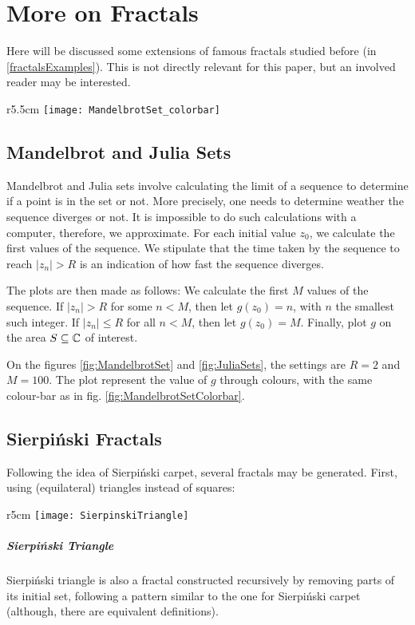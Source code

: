 \section{More on Fractals}
Here will be discussed some extensions of famous fractals studied before (in \ref{fractalsExamples}).
This is not directly relevant for this paper, but an involved reader may be interested.

\begin{wrapfigure}{r}{5.5cm}
	\vspace{-1.5cm}
	\texttt{[image: MandelbrotSet\_colorbar]}
	\centering
	\captionsetup{justification=centering}
	\caption{Mandelbrot Set}
	\label{fig:MandelbrotSetColorbar}
\end{wrapfigure}
\subsection{Mandelbrot and Julia Sets}
Mandelbrot and Julia sets involve calculating the limit of a sequence to determine if a point is in the set or not.
More precisely, one needs to determine weather the sequence diverges or not.
It is impossible to do such calculations with a computer, therefore, we approximate.
For each initial value $z_0$, we calculate the first values of the sequence.
We stipulate that the time taken by the sequence to reach $|z_n|>R$ is an indication of how fast the sequence diverges.

The plots are then made as follows:
We calculate the first $M$ values of the sequence.
If $|z_n|>R$ for some $n<M$, then let $g(z_0) = n$, with $n$ the smallest such integer.
If $|z_n| \leq R$ for all $n<M$, then let $g(z_0) = M$.
Finally, plot $g$ on the area $S \subseteq \mathbb{C}$ of interest.

On the figures \ref{fig:MandelbrotSet} and \ref{fig:JuliaSets}, the settings are $R=2$ and $M=100$.
The plot represent the value of $g$ through colours, with the same colour-bar as in fig. \ref{fig:MandelbrotSetColorbar}.


\subsection{Sierpiński Fractals}
Following the idea of Sierpiński carpet, several fractals may be generated.
First, using (equilateral) triangles instead of squares:

\begin{wrapfigure}{r}{5cm}
	\vspace{-0.5cm}
	\texttt{[image: SierpinskiTriangle]}
	\centering
	\captionsetup{justification=centering}
	\caption{Sierpinski Triangle (8 steps)}
	\label{fig:SierpinskiTriangle}
	\vspace{-3cm}
\end{wrapfigure}
\subparagraph{Sierpiński Triangle}
Sierpiński triangle is also a fractal constructed recursively by removing parts of its initial set, following a pattern similar to the one for Sierpiński carpet (although, there are equivalent definitions).

